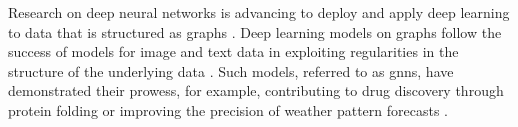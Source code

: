 Research on deep neural networks is advancing to deploy and apply deep learning to data that is structured as graphs \cite{wu_comprehensive_2021}. Deep learning models on graphs follow the success of models for image and text data in exploiting regularities in the structure of the underlying data \cite{bronstein_geometric_2021}.
Such models, referred to as \glspl{gnn}, have demonstrated their prowess, for example, contributing to drug discovery through protein folding \cite{jumper_highly_2021} or improving the precision of weather pattern forecasts \cite{lam_graphcast_2023}.

